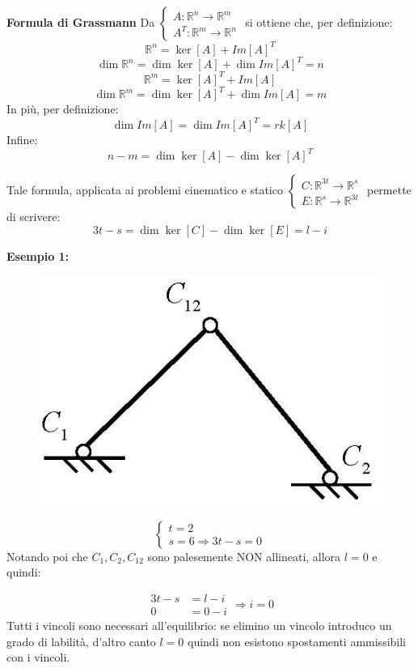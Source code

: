 \documentclass{article}
\begin{document}
\begin{adjustwidth}{2in}{}
\textbf{Formula di Grassmann}\newline
Da $ \begin{cases}
	A: \mathbb{R}^n \rightarrow \mathbb{R}^m \\
	A^T: \mathbb{R}^m \rightarrow \mathbb{R}^n 
\end{cases}$ si ottiene che, per definizione: 
\[
\mathbb{R}^n = \ker[A] + Im[A]^T
\]
\[
\dim{\mathbb{R}^n} = \dim{\ker[A]} + \dim{Im[A]^T} = n
\]
\[
\mathbb{R}^m = \ker[A]^T + Im[A]
\]
\[
\dim{\mathbb{R}^m} = \dim{\ker[A]^T} + \dim{Im[A]} = m
\]	
In più, per definizione: 
\[
\dim{Im[A]} = \dim{Im[A]^T} = rk[A]
\]	
Infine: 
\[
n-m = \dim{\ker[A]} - \dim{\ker[A]^T}
\]	

Tale formula, applicata ai problemi cinematico e statico
$
\begin{cases}
	C: \mathbb{R}^{3t} \rightarrow \mathbb{R}^s \\
	E: \mathbb{R}^s \rightarrow \mathbb{R}^{3t} 
\end{cases}
$ permette di scrivere:
\[
3t-s = \dim{\ker[C]} - \dim{\ker[E]} = l - i
\]	

\textbf{Esempio 1:} \newline 
\begin{figure}[H]
	\centering
	\includegraphics[width=0.2\linewidth]{immagini/1.PARTE4_Pagina_05}
\end{figure}

\[
\begin{cases}
	t=2 \\
	s=6 \Rightarrow 3t-s=0
\end{cases} 
\]
Notando poi che $ C_1, C_2, C_{12}$ sono palesemente NON allineati, allora $l = 0$ e quindi:

\[
\begin{split}
3t-s & = l - i \\
0 & = 0 - i
\end{split}  \Rightarrow i = 0 
\]
Tutti i vincoli sono necessari all'equilibrio: se elimino un vincolo introduco un grado di labilità, d'altro canto $l=0$ quindi non esistono spostamenti ammissibili con i vincoli. \newline 


\end{adjustwidth}
\end{document}

